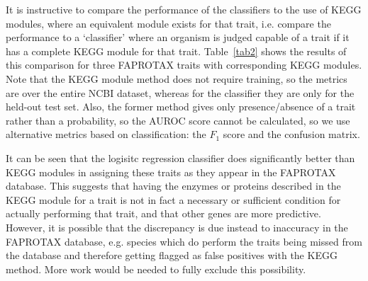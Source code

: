 \documentclass[10pt,letterpaper]{article}
\begin{document}
It is instructive to compare the performance of the classifiers to the use of KEGG modules, where an equivalent module exists for that trait, i.e. compare the performance to a `classifier' where an organism is judged capable of a trait if it has a complete KEGG module for that trait. Table~\ref{tab2} shows the results of this comparison for three FAPROTAX traits with corresponding KEGG modules. Note that the KEGG module method does not require training, so the metrics are over the entire NCBI dataset, whereas for the classifier they are only for the held-out test set. Also, the former method gives only presence/absence of a trait rather than a probability, so the AUROC score cannot be calculated, so we use alternative metrics based on classification: the $F_1$ score and the confusion matrix.

It can be seen that the logisitc regression classifier does significantly better than KEGG modules in assigning these traits as they appear in the FAPROTAX database. This suggests that having the enzymes or proteins described in the KEGG module for a trait is not in fact a necessary or sufficient condition for actually performing that trait, and that other genes are more predictive. However, it is possible that the discrepancy is due instead to inaccuracy in the FAPROTAX database, e.g. species which do perform the traits being missed from the database and therefore getting flagged as false positives with the KEGG method. More work would be needed to fully exclude this possibility.  
\end{document}
